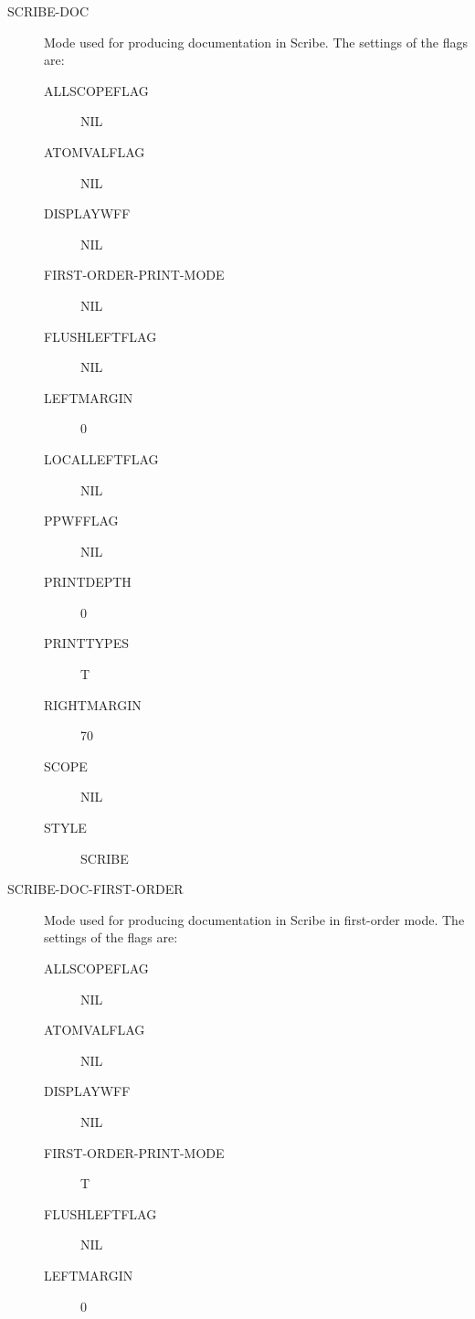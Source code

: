 \begin{description} 
\item[SCRIBE-DOC]  
Mode used for producing documentation in Scribe. The settings of the flags are:
\begin{description}
\item[ALLSCOPEFLAG] NIL

\item[ATOMVALFLAG] NIL

\item[DISPLAYWFF] NIL

\item[FIRST-ORDER-PRINT-MODE] NIL

\item[FLUSHLEFTFLAG] NIL

\item[LEFTMARGIN] 0

\item[LOCALLEFTFLAG] NIL

\item[PPWFFLAG] NIL

\item[PRINTDEPTH] 0

\item[PRINTTYPES] T

\item[RIGHTMARGIN] 70

\item[SCOPE] NIL

\item[STYLE] SCRIBE

\end{description}

\item[SCRIBE-DOC-FIRST-ORDER]  
Mode used for producing documentation in Scribe in first-order mode. The settings of the flags are:
\begin{description}
\item[ALLSCOPEFLAG] NIL

\item[ATOMVALFLAG] NIL

\item[DISPLAYWFF] NIL

\item[FIRST-ORDER-PRINT-MODE] T

\item[FLUSHLEFTFLAG] NIL

\item[LEFTMARGIN] 0


\end{description}
\end{description}
